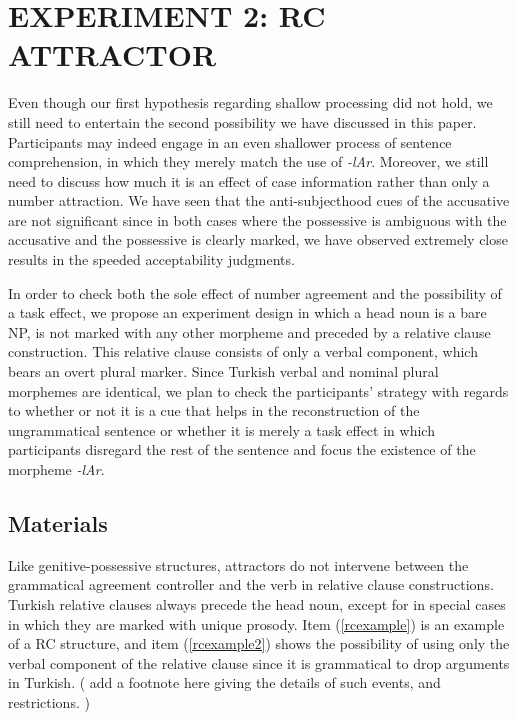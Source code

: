 \documentclass[11pt,a4paper]{article}
\begin{document}
\section{EXPERIMENT 2: RC ATTRACTOR}\label{experiment-2-rc-attractor}

Even though our first hypothesis regarding shallow processing did not
hold, we still need to entertain the second possibility we have
discussed in this paper. Participants may indeed engage in an even
shallower process of sentence comprehension, in which they merely match
the use of \emph{-lAr}. Moreover, we still need to discuss how much it
is an effect of case information rather than only a number attraction.
We have seen that the anti-subjecthood cues of the accusative are not
significant since in both cases where the possessive is ambiguous with
the accusative and the possessive is clearly marked, we have observed
extremely close results in the speeded acceptability judgments.

In order to check both the sole effect of number agreement and the
possibility of a task effect, we propose an experiment design in which a
head noun is a bare NP, is not marked with any other morpheme and
preceded by a relative clause construction. This relative clause
consists of only a verbal component, which bears an overt plural marker.
Since Turkish verbal and nominal plural morphemes are identical, we plan
to check the participants' strategy with regards to whether or not it is
a cue that helps in the reconstruction of the ungrammatical sentence or
whether it is merely a task effect in which participants disregard the
rest of the sentence and focus the existence of the morpheme
\emph{-lAr}.

\subsection{Materials}\label{materials}

Like genitive-possessive structures, attractors do not intervene between
the grammatical agreement controller and the verb in relative clause
constructions. Turkish relative clauses always precede the head noun,
except for in special cases in which they are marked with unique
prosody. Item (\ref{rcexample}) is an example of a RC structure, and
item (\ref{rcexample2}) shows the possibility of using only the verbal
component of the relative clause since it is grammatical to drop
arguments in Turkish. ( add a footnote here giving the details of such
events, and restrictions. )
\end{document}
